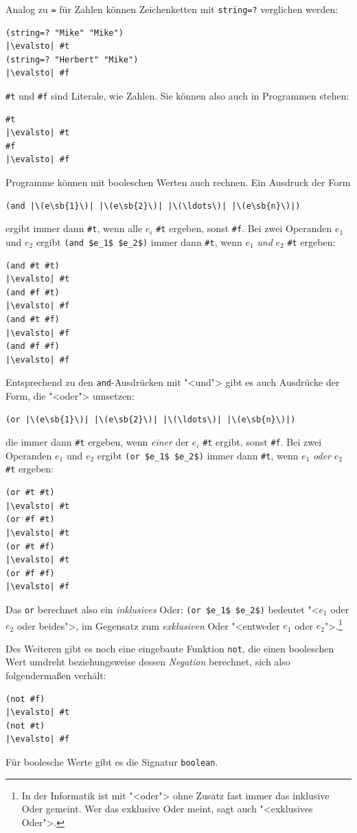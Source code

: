 Analog zu \lstinline{=} für Zahlen können Zeichenketten mit
\lstinline{string=?} verglichen werden:
\begin{lstlisting}
(string=? "Mike" "Mike")
|\evalsto| #t
(string=? "Herbert" "Mike")
|\evalsto| #f
\end{lstlisting}
%
\lstinline{#t} und \lstinline{#f} sind Literale, wie Zahlen. Sie können also
auch in Programmen stehen:
%
\begin{lstlisting}
#t
|\evalsto| #t
#f
|\evalsto| #f
\end{lstlisting}
%
Programme können mit booleschen Werten auch rechnen.  Ein Ausdruck der
Form
%
\begin{lstlisting}
(and |\(e\sb{1}\)| |\(e\sb{2}\)| |\(\ldots\)| |\(e\sb{n}\)|)
\end{lstlisting}
%
ergibt immer dann \lstinline{#t}, wenn alle $e_i$ \lstinline{#t} ergeben, sonst
\lstinline{#f}.  Bei zwei Operanden $e_1$ und $e_2$ ergibt
\lstinline{(and $e_1$ $e_2$)} immer dann \lstinline{#t}, wenn $e_1$ \emph{und} $e_2$
\lstinline{#t} ergeben:\label{page:and}
%
\begin{lstlisting}
(and #t #t)
|\evalsto| #t
(and #f #t)
|\evalsto| #f
(and #t #f)
|\evalsto| #f
(and #f #f)
|\evalsto| #f
\end{lstlisting}
%
Entsprechend zu den \lstinline{and}-Ausdrücken mit "<und"> gibt es auch Ausdrücke
der Form, die "<oder"> umsetzen:
%
\begin{lstlisting}
(or |\(e\sb{1}\)| |\(e\sb{2}\)| |\(\ldots\)| |\(e\sb{n}\)|)
\end{lstlisting}
%
die immer dann \lstinline{#t} ergeben, wenn \emph{einer} der $e_i$ \lstinline{#t} ergibt, sonst
\lstinline{#f}.  Bei zwei Operanden $e_1$ und $e_2$ ergibt
\lstinline{(or $e_1$ $e_2$)} immer dann \lstinline{#t}, wenn $e_1$ \emph{oder} $e_2$
\lstinline{#t} ergeben:
%
\begin{lstlisting}
(or #t #t)
|\evalsto| #t
(or #f #t)
|\evalsto| #t
(or #t #f)
|\evalsto| #t
(or #f #f)
|\evalsto| #f
\end{lstlisting}
%
Das \lstinline{or} berechnet also ein \textit{inklusives}
Oder: \lstinline{(or $e_1$ $e_2$)} bedeutet "<$e_1$ oder
$e_2$ oder beides">, im Gegensatz zum \textit{exklusiven}
Oder "<entweder $e_1$ oder
$e_2$">.\footnote{In der Informatik ist mit "<oder"> ohne Zusatz fast
  immer das inklusive Oder gemeint. Wer das exklusive Oder meint, sagt
  auch "<exklusives Oder">.}

Des Weiteren gibt es noch eine eingebaute Funktion
\lstinline{not}, die einen booleschen Wert
umdreht beziehungsweise dessen \textit{Negation}
berechnet, sich also folgendermaßen verhält:
%
\begin{lstlisting}
(not #f)
|\evalsto| #t
(not #t)
|\evalsto| #f
\end{lstlisting}
%
Für boolesche Werte gibt es die Signatur
\lstinline{boolean}.

